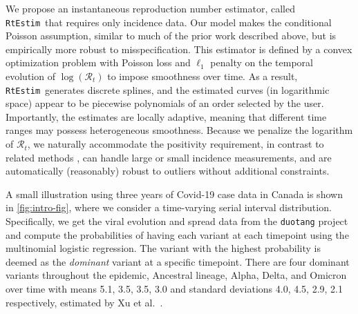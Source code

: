 \documentclass[10pt,letterpaper]{article}
\def\RtEstim{\texttt{RtEstim}}
\def\calR{\mathcal{R}}
\begin{document}
We propose an instantaneous reproduction number estimator, 
called \RtEstim\ that requires only incidence data. Our model makes the
conditional Poisson assumption, similar to much of the prior work described
above, but is empirically more robust to misspecification. This estimator is 
defined by a convex optimization problem with Poisson loss and $\ell_1$ penalty 
on the temporal evolution of $\log(\calR_t)$ to impose smoothness over time. 
As a result, \RtEstim\ generates discrete splines, and the estimated curves (in
logarithmic space) appear to be piecewise polynomials of an order selected by the
user. Importantly, the estimates are locally adaptive, meaning that different
time ranges may possess heterogeneous smoothness. Because we penalize the
logarithm of $\calR_t$, we naturally accommodate the positivity requirement, in
contrast to related methods \cite{abry2020spatial,pascal2022nonsmooth}, can
handle large or small incidence measurements, and are automatically (reasonably)
robust to outliers without additional constraints. 

A small illustration using three years of Covid-19 case data in Canada
\cite{CovidTimelineCanada} is shown in \autoref{fig:intro-fig}, where we
consider a time-varying serial interval distribution. Specifically, we get the
viral evolution and spread data from the \texttt{duotang} project
\cite{duotang_2023} and compute the probabilities of having each variant at each
timepoint using the multinomial logistic regression. The variant with the
highest probability is deemed as the \textit{dominant} variant at a specific
timepoint. There are four dominant variants throughout the epidemic, Ancestral
lineage, Alpha, Delta, and Omicron over time with means 5.1, 3.5, 3.5, 3.0 and
standard deviations 4.0, 4.5, 2.9, 2.1 respectively, estimated by Xu et al.~\cite{xu2023assessing}. 
\end{document}

